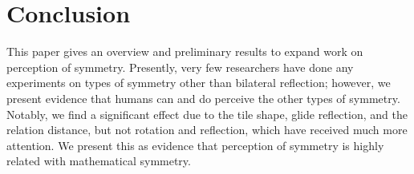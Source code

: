 \section{Conclusion}
This paper gives an overview and preliminary results to expand work on perception of symmetry. Presently, very few researchers have done any experiments on types of symmetry other than bilateral reflection; however, we present evidence that humans can and do perceive the other types of symmetry. Notably, we find a significant effect due to the tile shape, glide reflection, and the relation distance, but not rotation and reflection, which have received much more attention. We present this as evidence that perception of symmetry is highly related with mathematical symmetry.